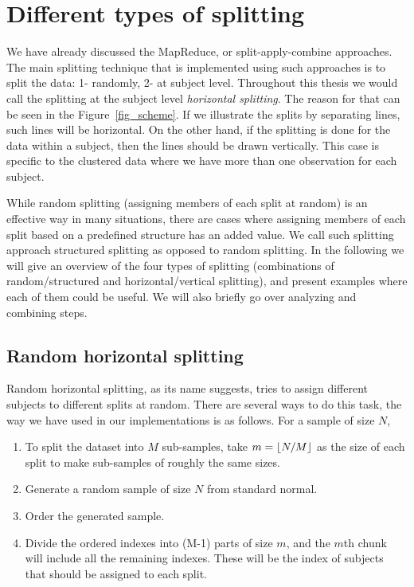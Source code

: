 \documentclass[11pt,a5paper,twoside]{book}
\DeclarePairedDelimiter\floor{\lfloor}{\rfloor}
\begin{document}
\section{Different types of splitting}

We have already discussed the MapReduce, or split-apply-combine approaches. The main splitting technique that is implemented using such approaches is to split the data: 1- randomly, 2- at subject level. Throughout this thesis we would call the splitting at the subject level \emph{horizontal splitting}. The reason for that can be seen in the Figure~\ref{fig_scheme}. If we illustrate the splits by separating lines, such lines will be horizontal. On the other hand, if the splitting is done for the data within a subject, then the lines should be drawn vertically. This case is specific to the clustered data where we have more than one observation for each subject. 

While random splitting (assigning members of each split at random) is an effective way in many situations, there are cases where assigning members of each split based on a predefined structure has an added value. We call such splitting approach structured splitting as opposed to random splitting. In the following we will give an overview of the four types of splitting (combinations of random/structured and horizontal/vertical splitting), and present examples where each of them could be useful. We will also briefly go over analyzing and combining steps.

\subsection{Random horizontal splitting}    

Random horizontal splitting, as its name suggests, tries to assign different subjects to different splits at random. There are several ways to do this task, the way we have used in our implementations is as follows. For a sample of size $N$,

\begin{enumerate}
\item To split the dataset into $M$ sub-samples, take $m = \floor{N/M}$ as the size of each split to make sub-samples of roughly the same sizes.
\item Generate a random sample of size $N$ from standard normal.
\item Order the generated sample.
\item Divide the ordered indexes into (M-1) parts of size $m$, and the $m$th chunk will include all the remaining indexes. These will be the index of subjects that should be assigned to each split.
\end{enumerate}
\end{document}

